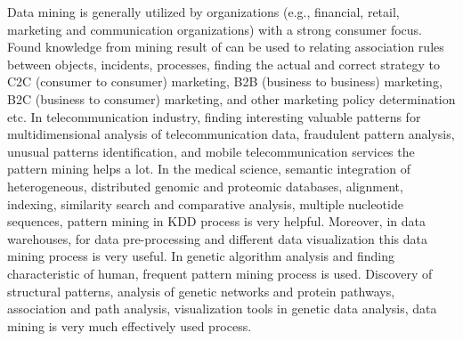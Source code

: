 Data mining is generally utilized by organizations (e.g., financial, retail, marketing and communication organizations) with a strong consumer focus. Found knowledge from mining result of can be used to relating association rules between objects, incidents, processes, finding the actual and correct strategy to C2C (consumer to consumer) marketing, B2B (business to business) marketing, B2C (business to consumer) marketing, and other marketing policy determination etc. In telecommunication industry, finding interesting valuable patterns for multidimensional analysis of telecommunication data, fraudulent pattern analysis, unusual patterns identification, and mobile telecommunication services the pattern mining helps a lot. In the medical science, semantic integration of heterogeneous, distributed genomic and proteomic databases, alignment, indexing, similarity search and comparative analysis, multiple nucleotide sequences, pattern mining in KDD process is very helpful. Moreover, in data warehouses, for data pre-processing and different data visualization this data mining process is very useful. In genetic algorithm analysis and finding characteristic of human, frequent pattern mining process is used. Discovery of structural patterns, analysis of genetic networks and protein pathways, association and path analysis, visualization tools in genetic data analysis, data mining is very much effectively used process.


